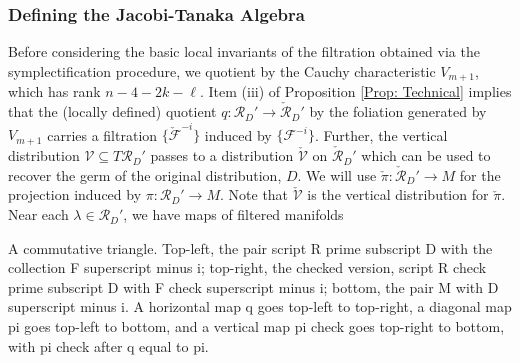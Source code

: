 \documentclass[11pt,letterpaper]{amsart}
\numberwithin{equation}{section}
\newcommand\alttext[1]{%
\useasboundingbox (current bounding box);
\draw let  \p1 = (current bounding box.south west),
        \p2 = (current bounding box.north east)
    in
  node at (current bounding box.center) 
     {\pdftooltip{\phantom{\rule{\dimexpr\x2-\x1\relax}{\dimexpr\y2-\y1\relax}}}%
                 {#1}};
}
\begin{document}
\subsubsection{Defining the Jacobi-Tanaka Algebra}
Before considering the basic local invariants of the filtration obtained via the symplectification procedure, we quotient by the Cauchy characteristic $V_{m+1}$, which has rank $n-4-2k-\ell$. Item (iii) of Proposition \ref{Prop: Technical} implies that the (locally defined) quotient $q:\mathcal R_D'\to \check{\mathcal R}_D'$ by the foliation generated by $V_{m+1}$ carries a filtration $\{\check {\mathcal F}^{-i}\}$ induced by $\{\mathcal F^{-i}\}$. Further, the vertical distribution ${\mathcal{V}}\subseteq T\mathcal R_D'$ passes to a distribution $\check{\mathcal{V}}$ on $\check{\mathcal R}_D'$ which can be used to recover the germ of the original distribution, $D$. We will use $\check \pi:\check{\mathcal R}_D'\to M$ for the projection induced by $\pi:\mathcal R_D'\to M$. Note that $\check{\mathcal{V}}$ is the vertical distribution for $\check \pi$. Near each $\lambda\in\mathcal R_D'$, we have maps of filtered manifolds
\begin{center}
\begin{altfig}{A commutative triangle. Top-left, the pair script R prime subscript D with the collection F superscript minus i; top-right, the checked version, script R check prime subscript D with F check superscript minus i; bottom, the pair M with D superscript minus i. A horizontal map q goes top-left to top-right, a diagonal map pi goes top-left to bottom, and a vertical map pi check goes top-right to bottom, with pi check after q equal to pi.}

\end{altfig}
\end{center}
\end{document}
